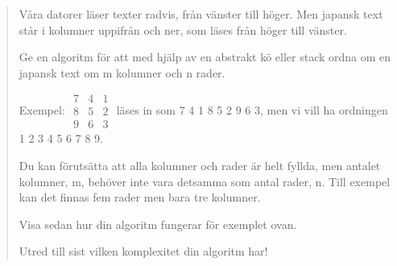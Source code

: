 \begin{frame}
  \begin{exercise}[A-nivå]
    \begin{quotation}
      Våra datorer läser texter radvis, från vänster till höger. Men japansk 
      text står i kolumner uppifrån och ner, som läses från höger till vänster.

      Ge en algoritm för att med hjälp av en abstrakt kö eller stack ordna om 
      en japansk text om m kolumner och n rader.

      Exempel:
      \(\begin{matrix}
        7 & 4 & 1 \\
        8 & 5 & 2 \\
        9 & 6 & 3
      \end{matrix}\)
      läses in som 7 4 1 8 5 2 9 6 3, men vi vill ha ordningen 1 2 3 4 5 6 7 8 
      9.

      Du kan förutsätta att alla kolumner och rader är helt fyllda, men antalet 
      kolumner, m, behöver inte vara detsamma som antal rader, n. Till exempel 
      kan det finnas fem rader men bara tre kolumner.

      Visa sedan hur din algoritm fungerar för exemplet ovan.

      Utred till sist vilken komplexitet din algoritm har!
    \end{quotation}
  \end{exercise}
\end{frame}
